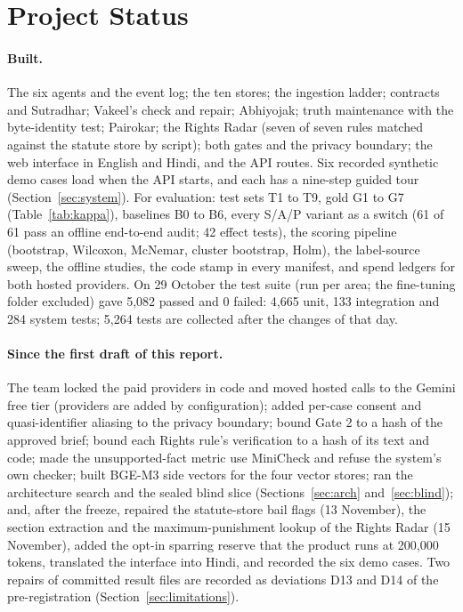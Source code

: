 \section{Project Status}
\label{sec:status}

\paragraph{Built.} The six agents and the event log; the ten stores; the ingestion ladder; contracts and Sutradhar; Vakeel's check and repair; Abhiyojak; truth maintenance with the byte-identity test; Pairokar; the Rights Radar (seven of seven rules matched against the statute store by script); both gates and the privacy boundary; the web interface in English and Hindi, and the API routes. Six recorded synthetic demo cases load when the API starts, and each has a nine-step guided tour (Section~\ref{sec:system}). For evaluation: test sets T1 to T9, gold G1 to G7 (Table~\ref{tab:kappa}), baselines B0 to B6, every S/A/P variant as a switch (61 of 61 pass an offline end-to-end audit; 42 effect tests), the scoring pipeline (bootstrap, Wilcoxon, McNemar, cluster bootstrap, Holm), the label-source sweep, the offline studies, the code stamp in every manifest, and spend ledgers for both hosted providers. On 29 October the test suite (run per area; the fine-tuning folder excluded) gave 5,082 passed and 0 failed: 4,665 unit, 133 integration and 284 system tests; 5,264 tests are collected after the changes of that day.

\paragraph{Since the first draft of this report.} The team locked the paid providers in code and moved hosted calls to the Gemini free tier (providers are added by configuration); added per-case consent and quasi-identifier aliasing to the privacy boundary; bound Gate 2 to a hash of the approved brief; bound each Rights rule's verification to a hash of its text and code; made the unsupported-fact metric use MiniCheck and refuse the system's own checker; built BGE-M3 side vectors for the four vector stores; ran the architecture search and the sealed blind slice (Sections~\ref{sec:arch} and~\ref{sec:blind}); and, after the freeze, repaired the statute-store bail flags (13 November), the section extraction and the maximum-punishment lookup of the Rights Radar (15 November), added the opt-in sparring reserve that the product runs at 200,000 tokens, translated the interface into Hindi, and recorded the six demo cases. Two repairs of committed result files are recorded as deviations D13 and D14 of the pre-registration (Section~\ref{sec:limitations}).

